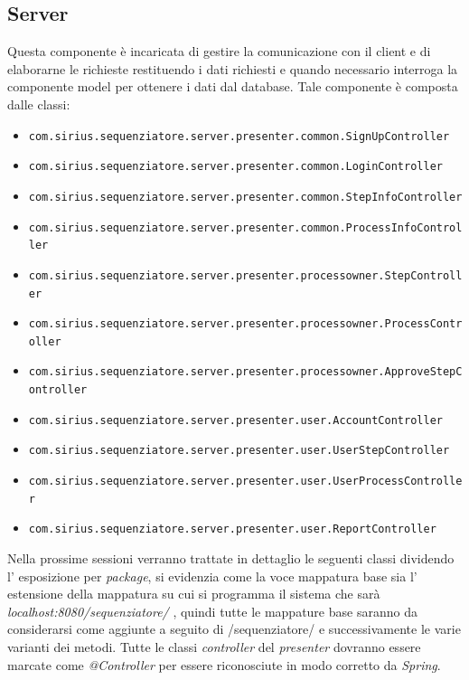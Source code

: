 \subsection{Server}
Questa componente è incaricata di gestire la comunicazione con il client e di elaborarne le richieste restituendo i dati richiesti e quando necessario interroga la componente model per ottenere i dati dal database.
Tale componente è composta dalle classi:
\begin{itemize}
	\item \texttt{com.sirius.sequenziatore.server.presenter.common.SignUpController}
	\item \texttt{com.sirius.sequenziatore.server.presenter.common.LoginController}
	\item \texttt{com.sirius.sequenziatore.server.presenter.common.StepInfoController}
	\item \texttt{com.sirius.sequenziatore.server.presenter.common.ProcessInfoController}
	\item \texttt{com.sirius.sequenziatore.server.presenter.processowner.StepController}
	\item \texttt{com.sirius.sequenziatore.server.presenter.processowner.ProcessController}
	\item \texttt{com.sirius.sequenziatore.server.presenter.processowner.ApproveStepController}
	\item \texttt{com.sirius.sequenziatore.server.presenter.user.AccountController}
	\item \texttt{com.sirius.sequenziatore.server.presenter.user.UserStepController}
	\item \texttt{com.sirius.sequenziatore.server.presenter.user.UserProcessController}
	\item \texttt{com.sirius.sequenziatore.server.presenter.user.ReportController}
\end{itemize}
Nella prossime sessioni verranno trattate in dettaglio le seguenti classi dividendo l' esposizione per \textit{package}, si evidenzia come la voce mappatura base sia l' estensione della mappatura su cui si programma il sistema che sarà \textit{localhost:8080/sequenziatore/} , quindi tutte le mappature base saranno da considerarsi come aggiunte a seguito di /sequenziatore/ e successivamente le varie varianti dei metodi.
Tutte le classi \textit{controller} del \textit{presenter} dovranno essere marcate come \textit{@Controller} per essere riconosciute in modo corretto da \textit{Spring}.
